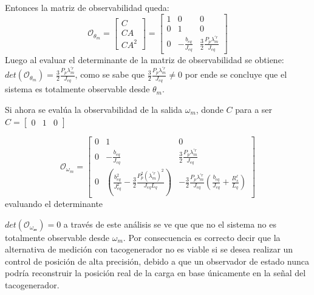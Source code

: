 \documentclass[blue,fullpaper]{ludusofficial}  %
\begin{document}
Entonces la matriz de observabilidad queda: 
\begin{equation}
\label{eq:observabilidad-posicion}
    \mathcal{O}_{\theta_m} = \begin{bmatrix}
C \\
CA \\
CA^2
\end{bmatrix}=\begin{bmatrix}
1 & 0 & 0 \\
0 & 1 & 0 \\
0 & -\frac{b_{eq}}{J_{eq}} & \frac{3}{2}\frac{P_p\lambda_{m}^{'r}}{J_{eq}}
\end{bmatrix}
\end{equation}
Luego al evaluar el determinante de la matriz de observabilidad se obtiene: $det(\mathcal{O}_{\theta_m})=\frac{3}{2}\frac{P_p\lambda_{m}^{'r}}{J_{eq}}$, como se sabe que $\frac{3}{2}\frac{P_p\lambda_{m}^{'r}}{J_{eq}} \neq 0$ por ende se concluye que el sistema es totalmente observable desde $\theta_m$.

Si ahora se evalúa la observabilidad de la salida $\omega_m$, donde $C$ para a ser $C=\begin{bmatrix}
    0&1&0
\end{bmatrix}$


\begin{equation}
\label{eq:observabilidad-velocidad}
    \mathcal{O}_{\omega_m} = \begin{bmatrix}
0 & 1 & 0 \\
0 & -\frac{b_{eq}}{J_{eq}} & \frac{3}{2}\frac{P_p\lambda_{m}^{'r}}{J_{eq}} \\
0 & \left( \frac{b_{eq}^2}{J_{eq}^2} - \frac{3}{2}\frac{P_p^2 (\lambda_{m}^{'r})^2}{J_{eq}L_q} \right) & -\frac{3}{2}\frac{P_p\lambda_{m}^{'r}}{J_{eq}} \left( \frac{b_{eq}}{J_{eq}} + \frac{R^\ell_s}{L_q} \right)
\end{bmatrix}
\end{equation}
evaluando el determinante 


$det(\mathcal{O_{\omega_m}})=0$ a través de este análisis se ve que que no el sistema no es totalmente observable desde $\omega_m$. Por consecuencia es correcto decir que la alternativa de medición con tacogenerador no es viable si se desea realizar un control de posición de alta precisión, debido a que un observador de estado nunca podría reconstruir la posición real de la carga en base únicamente en la señal del tacogenerador.

\end{document}

